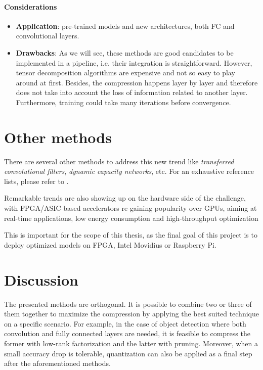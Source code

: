 \paragraph{Considerations}
\begin{itemize}
    \item \textbf{Application}: pre-trained models and new architectures, both FC and convolutional layers. 
    
    \item \textbf{Drawbacks}: As we will see, these methods are good candidates to be implemented in a pipeline, i.e. their integration is straightforward. However, tensor decomposition algorithms are expensive and not so easy to play around at first. Besides, the compression happens layer by layer and therefore does not take into account the loss of information related to another layer. Furthermore, training could take many iterations before convergence. 
\end{itemize}

\section{Other methods}
There are several other methods to address this new trend like \emph{transferred convolutional filters}, \emph{dynamic capacity networks}, etc. For an exhaustive reference lists, please refer to \parencite{survey2017}. 

Remarkable trends are also showing up on the hardware side of the challenge, with FPGA/ASIC-based accelerators re-gaining popularity over GPUs, aiming at real-time applications, low energy consumption and high-throughput optimization 

This is important for the scope of this thesis, as the final goal of this project is to deploy optimized models on FPGA, Intel Movidius or Raspberry Pi. 

\section{Discussion}
The presented methods are orthogonal. It is possible to combine two or three of them together to maximize the compression by applying the best suited technique on a specific scenario. For example, in the case of object detection where both convolution and fully connected layers are needed, it is feasible to compress the former with low-rank factorization and the latter with pruning. 
Moreover, when a small accuracy drop is tolerable, quantization can also be applied as a final step after the aforementioned methods. 
\newline 

